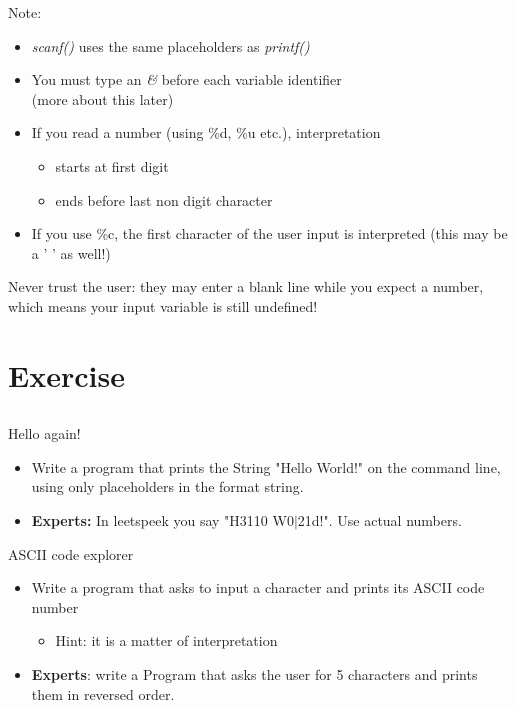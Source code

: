\begin{frame}{Note:}
	\begin{itemize}
		\item \textit{scanf()} uses the same placeholders as \textit{printf()}
		\item You must type an \textit{\&} before each variable identifier \\
			(more about this later)
		\item If you read a number (using \%d, \%u etc.), interpretation
		\begin{itemize}
			\item starts at first digit
			\item ends before last non digit character
		\end{itemize}
		\item If you use \%c, the first character of the user input is interpreted (this
		 may be a ' ' as well!)
	\end{itemize}
	Never trust the user: they may enter a blank line while you expect a number, which
	 means your input variable is still undefined!
		
\end{frame}
\section{Exercise}
\subsection{}

\begin{frame}[fragile]{Hello again!}
	\begin{itemize}
		\item Write a program that prints the String "Hello World!" on the command line,
		 using only placeholders in the format string.
		\item \textbf{Experts:} In leetspeek you say "H3110 W0$|$21d!". Use actual
		 numbers.
	\end{itemize}
\end{frame}
\begin{frame}[fragile]{ASCII code explorer}
	\begin{itemize}
		\item Write a program that asks to input a character and prints its ASCII code
		 number
		\begin{itemize}
			\item<2-> Hint: it is a matter of interpretation
		\end{itemize}
		\item \textbf{Experts}: write a Program that asks the user for 5 characters and
		 prints them in reversed order.

	\end{itemize}	
\end{frame}

